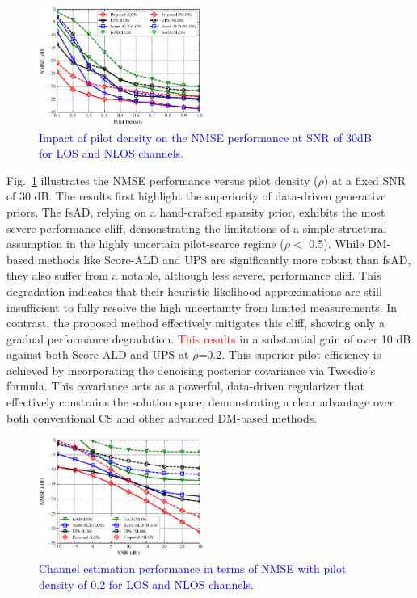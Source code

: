 \documentclass[lettersize,journal]{IEEEtran}
\newcommand{\tred}{\textcolor{red}}
\newcommand{\tblue}{\textcolor{blue}}
\begin{document}
\begin{figure}[!t]
\includegraphics[width=0.48\textwidth]{images/20251014/fig_1.eps}
\caption{\tblue{Impact of pilot density on the NMSE performance at SNR of 30dB for LOS and NLOS channels.}}
\label{fig_sim_1}
\end{figure}

Fig.~\ref{fig_sim_1} illustrates the NMSE performance versus pilot density ($\rho$) at a fixed SNR of 30 dB. The results first highlight the superiority of data-driven generative priors. The fsAD, relying on a hand-crafted sparsity prior, exhibits the most severe performance cliff, demonstrating the limitations of a simple structural assumption in the highly uncertain pilot-scarce regime ($\rho<$ 0.5).
While DM-based methods like Score-ALD and UPS are significantly more robust than fsAD, they also suffer from a notable, although less severe, performance cliff. This degradation indicates that their heuristic likelihood approximations are still insufficient to fully resolve the high uncertainty from limited measurements.
In contrast, the proposed method effectively mitigates this cliff, showing only a gradual performance degradation. \tred{This results} in a substantial gain of over 10 dB against both Score-ALD and UPS at $\rho$=0.2. This superior pilot efficiency is achieved by incorporating the denoising posterior covariance via Tweedie's formula. This covariance acts as a powerful, data-driven regularizer that effectively constrains the solution space, demonstrating a clear advantage over both conventional CS and other advanced DM-based methods.

\begin{figure}[!t]
\includegraphics[width=0.48\textwidth]{images/20251014/fig_2.eps}
\caption{\tblue{Channel estimation performance in terms of NMSE with pilot density of 0.2 for LOS and NLOS channels.}}
\label{fig_sim_2}
\end{figure}
\end{document}
